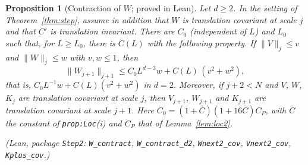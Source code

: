 \documentclass[11pt]{amsart}
\newtheorem{proposition}[theorem]{Proposition}
\theoremstyle{definition}
\theoremstyle{remark}
\numberwithin{equation}{section}
\begin{document}
\begin{proposition}[Contraction of $W$; proved in Lean]\label{prop:W-contract}
Let $d\ge2$. In the setting of Theorem~\ref{thm:step}, assume in addition that $W$ is
translation covariant at scale $j$ and that $C'$ is translation invariant. There are $C_0$
(independent of $L$) and $L_0$ such that, for $L\ge L_0$, there is $C(L)$ with the following
property. If $\|V\|_j\le v$ and $\|W\|_j\le w$ with $v,w\le1$, then
\[
  \|W_{j+1}\|_{j+1}\le C_0L^{d-3}w+C(L)\,(v^2+w^2),
\]
that is, $C_0L^{-1}w+C(L)(v^2+w^2)$ in $d=2$. Moreover, if $j+2<N$ and $V$, $W$, $K_j$ are
translation covariant at scale $j$, then $V_{j+1}$, $W_{j+1}$ and $K_{j+1}$ are translation
covariant at scale $j+1$. Here $C_0=(1+\bar C)(1+16\bar C)C_P$, with $\bar C$ the constant of
\texttt{prop:Loc}(i) and $C_P$ that of Lemma~\ref{lem:loc2}.

(Lean, package \texttt{Step2}: \texttt{W\_contract}, \texttt{W\_contract\_d2},
\texttt{Wnext2\_cov}, \texttt{Vnext2\_cov}, \texttt{Kplus\_cov}.)
\end{proposition}
\end{document}
